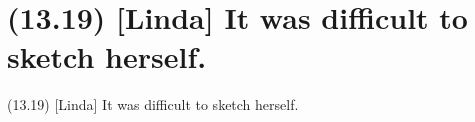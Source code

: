 \documentclass{article}
\begin{document}
\clearpage

%
%

\section*{(13.19) [Linda] It was difficult to sketch herself.}

\bigbreak
\begin{enumerate*}
\item[(13.19)] [Linda] It was difficult to sketch herself.
\end{enumerate*}
\bigbreak
\end{document}
